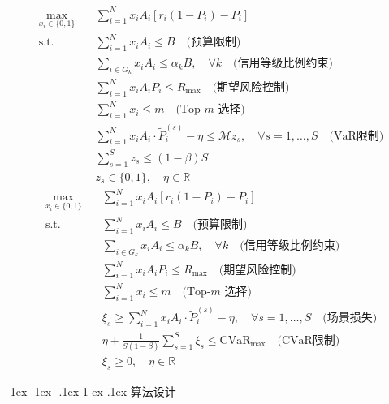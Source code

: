 \documentclass[nonblindrev]{write_paper}
\makeatletter
\renewcommand\section{\@startsection {section}{1}{\z@}%
                                   {-1ex \@plus -1ex \@minus -.1ex}%
                                   {1 ex \@plus.1ex}%
                                   {\normalfont\large\bfseries}}
\makeatother
\begin{document}
\begin{equation}
\begin{aligned}
\max_{x_i \in \{0,1\}} \quad & \sum_{i=1}^N x_i A_i \left[ r_i(1 - P_i) - P_i \right] \\
\text{s.t.} \quad
& \sum_{i=1}^N x_i A_i \le B \quad \text{(预算限制)} \\
& \sum_{i \in G_k} x_i A_i \le \alpha_k B, \quad \forall k \quad \text{(信用等级比例约束)} \\
& \sum_{i=1}^N x_i A_i P_i \le R_{\max} \quad \text{(期望风险控制)} \\
& \sum_{i=1}^N x_i \le m \quad \text{(Top-$m$ 选择)} \\
& \sum_{i=1}^N x_i A_i \cdot \tilde{P}_i^{(s)} - \eta \le \mathcal{M} z_s, \quad \forall s=1,\dots,S \quad \text{(VaR限制)} \\
& \sum_{s=1}^S z_s \le (1 - \beta) S \\
& z_s \in \{0,1\}, \quad \eta \in \mathbb{R}
\end{aligned}
\label{eq:var_model}
\end{equation}
\begin{equation}
\begin{aligned}
\max_{x_i \in \{0,1\}} \quad & \sum_{i=1}^N x_i A_i \left[ r_i(1 - P_i) - P_i \right] \\
\text{s.t.} \quad
& \sum_{i=1}^N x_i A_i \le B \quad \text{(预算限制)} \\
& \sum_{i \in G_k} x_i A_i \le \alpha_k B, \quad \forall k \quad \text{(信用等级比例约束)} \\
& \sum_{i=1}^N x_i A_i P_i \le R_{\max} \quad \text{(期望风险控制)} \\
& \sum_{i=1}^N x_i \le m \quad \text{(Top-$m$ 选择)} \\
& \xi_s \ge \sum_{i=1}^N x_i A_i \cdot \tilde{P}_i^{(s)} - \eta, \quad \forall s = 1,\dots,S \quad \text{(场景损失)} \\
& \eta + \frac{1}{S(1 - \beta)} \sum_{s=1}^S \xi_s \le \text{CVaR}_{\max} \quad \text{(CVaR限制)} \\
& \xi_s \ge 0, \quad \eta \in \mathbb{R}
\end{aligned}
\label{eq:cvar_model}
\end{equation}

\section{算法设计}
\end{document}
